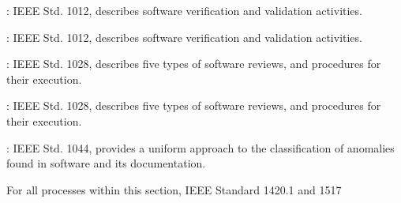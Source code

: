 \begin{adjustwidth}{0.5em}{0pt}
\begin{compactitem}
\begin{compactitem}
			\item {}: IEEE Std. 1012, describes software verification and validation activities. 

			\item {}: IEEE Std. 1012, describes software verification and validation activities. 

			\item {}: IEEE Std. 1028, describes five types of software reviews, and procedures for their execution. 

			\item {}: IEEE Std. 1028, describes five types of software reviews, and procedures for their execution. 

			\item {}: IEEE Std. 1044, provides a uniform approach to the classification of anomalies found in software and its documentation. 
			
		\end{compactitem}

		\item {}
		\begin{compactitem}

			\item For all processes within this section, IEEE Standard 1420.1 and 1517
			
		\end{compactitem}

	\end{compactitem}

\end{adjustwidth}